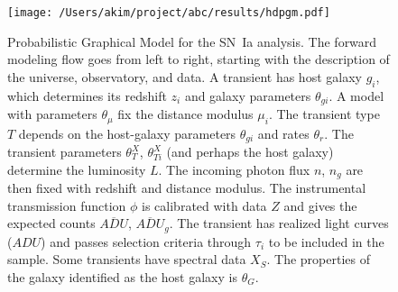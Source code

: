 \documentclass[preprint]{aastex}
\begin{document}
\begin{figure}[htbp] %
   \centering
   \texttt{[image: /Users/akim/project/abc/results/hdpgm.pdf]} 
   \caption{Probabilistic Graphical Model for the SN~Ia analysis.  
   The forward modeling
   flow goes from left to right, starting with the description of the universe, observatory,
   and data.    A transient has host galaxy $g_i$, which determines its redshift $z_i$
   and galaxy parameters $\theta_{gi}$.
   A model with parameters $\theta_\mu$ fix the distance modulus $\mu_i$.
   The transient type $T$ depends on the host-galaxy parameters  $\theta_{gi}$
   and rates $\theta_r$.   The transient
   parameters $\theta_T^X$, $\theta_{Ti}^X$ (and perhaps the host galaxy) determine the luminosity $L$.       The 
   incoming photon flux $n$, $n_g$  are then fixed
   with redshift and distance modulus.
   The instrumental transmission function $\phi$ is calibrated with data ${Z}$ and
   gives the expected
   counts $\overline{\mathit{ADU}}$, $\overline{\mathit{ADU}}_g$. 
   The transient has realized light curves (${ADU}$) and passes selection criteria
   through $\tau_i$ to be included in the sample.  Some transients have spectral data
   ${X}_S$.  The properties of the galaxy identified as the host galaxy is $\theta_G$. 
   \label{pgm:fig}}
\end{figure}
\end{document}
